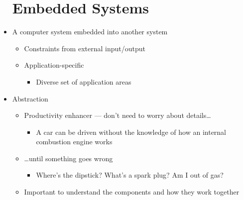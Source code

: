 \begin{itemize}

    \section{Embedded Systems}

  \item A computer system embedded into another system

    \begin{itemize} 

      \item Constraints from external input/output 

      \item Application-specific

        \begin{itemize} 

          \item Diverse set of application areas

        \end{itemize}

    \end{itemize}

  \item Abstraction

    \begin{itemize}

      \item Productivity enhancer — don't need to worry about details\ldots

        \begin{itemize}

          \item A car can be driven without the knowledge of how an internal combustion engine works

        \end{itemize}

      \item \ldots until something goes wrong

        \begin{itemize}

          \item Where's the dipstick? What's a spark plug? Am I out of gas?

        \end{itemize}

      \item Important to understand the components and how they work together


\end{itemize}
\end{itemize}
